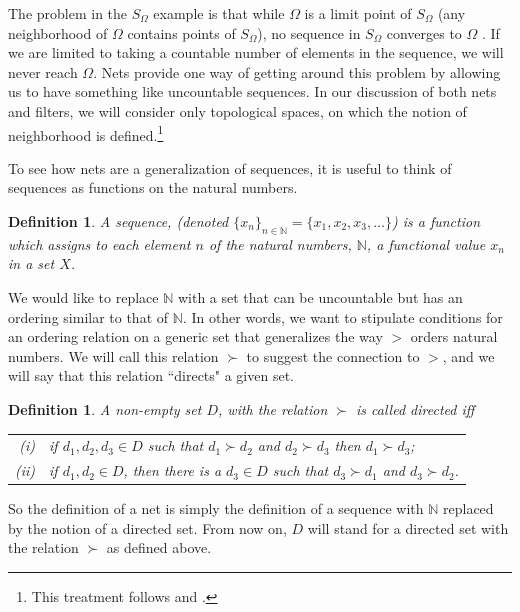 \documentclass[12pt]{article}
\newtheorem{dfn}[thm]{Definition}
\begin{document}
 

The problem in the $S_\Omega$ example is that while $\Omega$ is a limit point of
$S_\Omega$  (any neighborhood of  $\Omega$ contains points of  $S_\Omega$), no
sequence in  $S_\Omega$ converges to $\Omega$ \cite[p. 76]{kell}. If we are limited to
taking a countable number of elements in the sequence, we will never reach $\Omega$. 
Nets provide one way of getting around this problem by allowing us to have something
like uncountable sequences. In our discussion of both nets and filters, we will consider only topological spaces, on which the notion of neighborhood is defined.\footnote{This treatment follows \cite[pp. 62-70]{kell} and
\cite[pp. 281-283, 286-289]{mcsh}.} 

To see how nets are a generalization of sequences, it is useful to think of
 sequences as functions on the natural numbers.

\begin{dfn}
A {\em sequence}, (denoted $\{x_n\}_{n \in \mathbb{N}} = \{x_1, x_2, x_3,\ldots\}$) is a function
which assigns to each element $n$ of the
 natural numbers, $\mathbb{N}$, a functional value $x_n$  in a set $X$.  
\end{dfn}

We would like to replace $\mathbb{N}$ with a set that can be uncountable but has an ordering
similar to that of $\mathbb{N}$. In other words, we want to stipulate conditions for an
ordering relation on a generic set that generalizes the way $>$ orders natural
numbers. We will call this relation $\succ$  to suggest the connection to $>$, and we
will say that this relation ``directs" a given set.

\begin{dfn}
A non-empty set $D$, with the relation $\succ$ is called {\em directed} iff
\begin{tabular}{r@{  }l}
 (i)  &if $d_1, d_2, d_3 \in D$  such that $d_1 \succ d_2$  and
$d_2 \succ d_3$  then $d_1 \succ d_3$;\\
 (ii)  &if  $d_1, d_2 \in D$, then there is a $d_3 \in D$  such that $d_3
\succ d_1$  and $d_3 \succ d_2$.\\
\end{tabular}
\end{dfn}

So the definition of a net is simply the definition of a sequence with $\mathbb{N}$  replaced
 by the notion of a directed set. From now on, $D$  will stand for a directed set with
the relation $\succ$  as defined above. 
\end{document}

